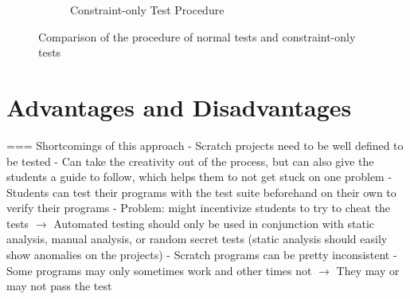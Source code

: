 \begin{figure}[h]
\begin{subfigure}[b]{.45\textwidth}

        \caption{Constraint-only Test Procedure}
        \label{fig:constraint_only_test_procedure}
    \end{subfigure}
    \caption{Comparison of the procedure of normal tests and constraint-only tests}
    \label{fig:comparison_of_the_procedure_of_normal_tests_and_constraint_only_tests}
\end{figure}

\section{Advantages and Disadvantages}

=== Shortcomings of this approach
- Scratch projects need to be well defined to be tested
    - Can take the creativity out of the process, but can also give the students a guide to follow, which helps them to not get stuck on one problem
    - Students can test their programs with the test suite beforehand on their own to verify their programs
    - Problem: might incentivize students to try to cheat the tests
        $\rightarrow$ Automated testing should only be used in conjunction with static analysis, manual analysis, or random secret tests
        (static analysis should easily show anomalies on the projects)
- Scratch programs can be pretty inconsistent
    - Some programs may only sometimes work and other times not
    $\rightarrow$ They may or may not pass the test

